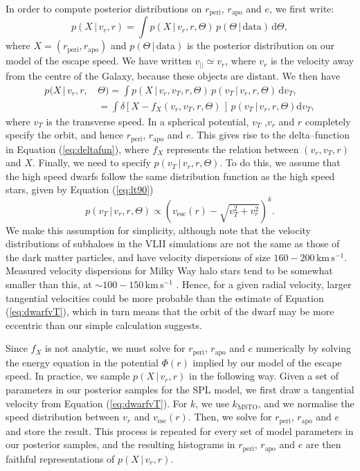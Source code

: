 \documentclass[useAMS,twocolumn,usenatbib]{mn2e}
\def\kms{{\,\mathrm{km\,s^{-1}}}}
\def\vlos{{v_{||}}}
\def\vesc{{v_\mathrm{esc}}}
\def\intd{{\mathrm{d}}}
\def\rp{{r_\mathrm{peri}}}
\def\ra{{r_\mathrm{apo}}}
\def\ecc{{e}}
\begin{document}
In order to compute posterior distributions on $\rp$, $\ra$ and $\ecc$, we first write:
%
\begin{equation}
p(X\,|\,v_r,r) = \int p(X\,|\,v_r,r,\Theta)\,p(\Theta\,|\,\mathrm{data})\,\intd \Theta,
\label{eq:dwarfpost}
\end{equation}
%
where $X = (\rp,\ra)$ and $p(\Theta\,|\,\mathrm{data})$ is the posterior distribution on our model of the escape speed. 
We have written $\vlos \simeq v_r$, where $v_r$ is the velocity away from the centre of the Galaxy, because these objects are distant.  
We then have
%
\begin{align}
p(X\,|\,v_r,r,\,&\Theta) = \int p(X\,|\,v_r,v_T,r,\Theta)\,p(v_T\,|\,v_r,r,\Theta)\,\intd v_T, \nonumber \\
                     &= \int \delta\left[X - f_X(v_r,v_T,r,\Theta)\,\right]\,p(v_T\,|\,v_r,r,\Theta) \intd v_T,
\label{eq:deltafun}
\end{align}
%
where $v_T$ is the transverse speed. 
In a spherical potential, $v_T$ ,$v_r$ and $r$ completely specify the orbit, and hence $\rp$, $\ra$ and $\ecc$. 
This gives rise to the delta--function in Equation (\ref{eq:deltafun}), where $f_X$ represents the relation between $(v_r,v_T,r)$ and $X$. 
Finally, we need to specify $p(v_T\,|\,v_r,r,\Theta)$. 
To do this, we assume that the high speed dwarfs follow the same distribution function as the high speed stars, given by Equation (\ref{eq:lt90})
%
\begin{equation}
p(v_T\,|\,v_r,r,\Theta) \propto \left(\vesc(r) - \sqrt{v_T^2+v_r^2}\right)^k.
\label{eq:dwarfvT} 
\end{equation}
%
We make this assumption for simplicity, although \citet{Er16} note that the velocity distributions of subhaloes in the VLII simulations \citep{Di08} are not the same as those of the dark matter particles, and have velocity dispersions of size $160-200\kms$.
Measured velocity dispersions for Milky Way halo stars tend to be somewhat smaller than this, at $\sim 100-150\kms$ \citep{Ev16}.
Hence, for a given radial velocity, larger tangential velocities could be more probable than the estimate of Equation (\ref{eq:dwarfvT}), which in turn means that the orbit of the dwarf may be more eccentric than our simple calculation suggests.

Since $f_X$ is not analytic, we must solve for $\rp$, $\ra$ and $\ecc$ numerically by solving the energy equation in the potential $\Phi(r)$ implied by our model of the escape speed.
In practice, we sample $p(X\,|\,v_r,r)$ in the following way. 
Given a set of parameters in our posterior samples for the SPL model, we first draw a tangential velocity from Equation (\ref{eq:dwarfvT}). 
For $k$, we use $k_\mathrm{MSTO}$, and we normalise the speed distribution between $v_r$ and $\vesc(r)$. 
Then, we solve for $\rp$, $\ra$ and $\ecc$ and store the result. 
This process is repeated for every set of model parameters in our posterior samples, and the resulting histograms in $\rp$, $\ra$ and $\ecc$ are then faithful representations of $p(X\,|\,v_r,r)$.
\end{document}
